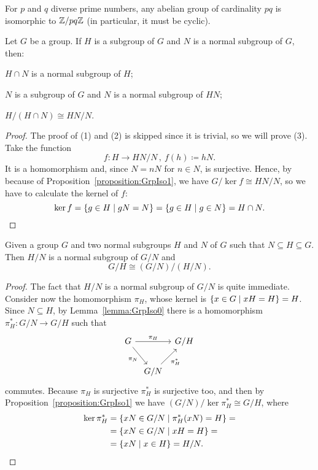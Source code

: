 \begin{exercise}
For \(p\) and \(q\) diverse prime numbers, any abelian group of cardinality \(pq\) is isomorphic to \(\mathbb Z/pq\mathbb Z\) (in particular, it must be cyclic).
\end{exercise}

\begin{proposition}
Let \(G\) be a group. If \(H\) is a subgroup of \(G\) and \(N\) is a normal subgroup of \(G\), then:
\begin{tcbenum}
\item \(H \cap N\) is a normal subgroup of \(H\);
\item \(N\) is a subgroup of \(G\) and \(N\) is a normal subgroup of \(HN\);
\item \(H/(H \cap N) \cong HN/N\).
\end{tcbenum}
\end{proposition}

\begin{proof}
The proof of (1) and (2) is skipped since it is trivial, so we will prove (3). Take the function
\[f : H \to HN/N\,, \ f(h) \coloneq hN .\]
It is a homomorphism and, since \(N = nN\) for \(n \in N\), is surjective.
Hence, by because of Proposition~\ref{proposition:GrpIso1}, we have \(G/\ker f \cong HN/N\), so we have to calculate the kernel of \(f\):
\[\ker f = \left\{g \in H \mid gN = N\right\} = \left\{g \in H \mid g \in N\right\} = H \cap N .\qedhere\]
\end{proof}

\begin{proposition}
Given a group \(G\) and two normal subgroups \(H\) and \(N\) of \(G\) such that \(N \subseteq H \subseteq G\). Then \(H/N\) is a normal subgroup of \(G/N\) and
\[G/H \cong (G/N)/(H/N) .\]
\end{proposition}

\begin{proof}
The fact that \(H/N\) is a normal subgroup of \(G/N\) is quite immediate. Consider now the homomorphism \(\pi_H\), whose kernel is \(\left\{x \in G \mid xH = H\right\} = H\). Since \(N \subseteq H\), by Lemma~\ref{lemma:GrpIso0} there is a homomorphism \(\pi_H^\ast : G/N \to G/H\) such that
\[\begin{tikzcd}[column sep=tiny]
G \ar["{\pi_H}", rr] \ar["\pi_N", swap, dr] & & G/H \\
& G/N \ar["{\pi_H^\ast}", swap, ur]
\end{tikzcd}\]
commutes. Because \(\pi_H\) is surjective \(\pi_H^\ast\) is surjective too, and then by Proposition~\ref{proposition:GrpIso1} we have \((G/N)/\ker \pi_H^\ast \cong G/H\), where
\begin{align*}
\ker \pi_H^\ast &= \left\{xN \in G/N \mid \pi_H^\ast(xN) = H\right\} = \\
                &= \left\{xN \in G/N \mid xH = H\right\} = \\
                &= \left\{xN \mid x \in H\right\} = H/N .\qedhere
\end{align*}
\end{proof}

